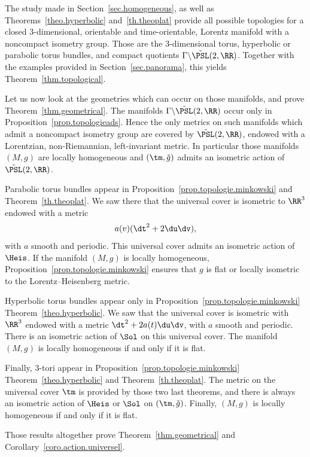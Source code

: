 The study made in Section~\ref{sec.homogeneous}, as well as Theorems~\ref{theo.hyperbolic} and~\ref{th.theoplat} provide all possible topologies for a closed $3$-dimensional, orientable and time-orientable, Lorentz manifold with a noncompact isometry group. Those are the $3$-dimensional torus, hyperbolic or parabolic torus bundles, and compact quotients $\Gamma \backslash \tilde{\PSL}(2,\RR)$. Together with the examples provided in Section~\ref{sec.panorama}, this yields Theorem~\ref{thm.topological}.

Let us now look at the geometries which can occur on those manifolds, and prove Theorem~\ref{thm.geometrical}. The manifolds $\Gamma \backslash \tilde{\PSL}(2,\RR)$ occur only in Proposition~\ref{prop.topologieads}. Hence the only metrics on such manifolds which admit a noncompact isometry group are covered by $\tilde{\PSL}(2,\RR)$, endowed with a Lorentzian, non-Riemannian, left-invariant metric. In particular those manifolds $(M,g)$ are locally homogeneous and $(\tm,\tilde{g})$ admits an isometric action of $\tilde{\PSL}(2,\RR)$.

Parabolic torus bundles appear in Proposition~\ref{prop.topologie.minkowski} and Theorem~\ref{th.theoplat}. We saw there that the universal cover is isometric to $\RR^3$ endowed with a metric
\[
a(v)(\dt^2+2\du\dv),
\]
with $a$ smooth and periodic. This universal cover admits an isometric action of $\Heis$. If the manifold $(M,g)$ is locally homogeneous, Proposition~\ref{prop.topologie.minkowski} ensures that $g$ is flat or locally isometric to the Lorentz--Heisenberg metric.

Hyperbolic torus bundles appear only in Proposition~\ref{prop.topologie.minkowski} Theorem~\ref{theo.hyperbolic}. We saw that the universal cover is isometric with $\RR^3$ endowed with a metric $\dt^2+2a(t)\du\dv$, with $a$ smooth and periodic. There is an isometric action of $\Sol$ on this universal cover. The manifold $(M,g)$ is locally homogeneous if and only if it is flat.

Finally, $3$-tori appear in Proposition~\ref{prop.topologie.minkowski} Theorem~\ref{theo.hyperbolic} and Theorem~\ref{th.theoplat}. The metric on the universal cover $\tm$ is provided by those two last theorems, and there is always an isometric action of $\Heis$ or $\Sol$ on $(\tm,\tilde{g})$. Finally, $(M,g)$ is locally homogeneous if and only if it is flat.


Those results altogether prove Theorem~\ref{thm.geometrical} and Corollary~\ref{coro.action.universel}.

